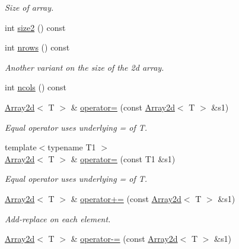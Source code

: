 \begin{DoxyCompactItemize}
\begin{DoxyCompactList}\small\item\em Size of array. \end{DoxyCompactList}\item 
int \mbox{\hyperlink{classXMLArray_1_1Array2d_a76f5ee9f75435c61089021f8cfbb6bf8}{size2}} () const
\item 
int \mbox{\hyperlink{classXMLArray_1_1Array2d_a05ca0ef1e6fdbafb2c7cc575f9c3081c}{nrows}} () const
\begin{DoxyCompactList}\small\item\em Another variant on the size of the 2d array. \end{DoxyCompactList}\item 
int \mbox{\hyperlink{classXMLArray_1_1Array2d_a9eecadb91fe97638a8d7adce77b0a562}{ncols}} () const
\item 
\mbox{\hyperlink{classXMLArray_1_1Array2d}{Array2d}}$<$ T $>$ \& \mbox{\hyperlink{classXMLArray_1_1Array2d_a9fafd7ae228834d56b08fb5b1485eba4}{operator=}} (const \mbox{\hyperlink{classXMLArray_1_1Array2d}{Array2d}}$<$ T $>$ \&s1)
\begin{DoxyCompactList}\small\item\em Equal operator uses underlying = of T. \end{DoxyCompactList}\item 
{\footnotesize template$<$typename T1 $>$ }\\\mbox{\hyperlink{classXMLArray_1_1Array2d}{Array2d}}$<$ T $>$ \& \mbox{\hyperlink{classXMLArray_1_1Array2d_a2ac560b13ec78975a0cab0b2dcbfe72f}{operator=}} (const T1 \&s1)
\begin{DoxyCompactList}\small\item\em Equal operator uses underlying = of T. \end{DoxyCompactList}\item 
\mbox{\hyperlink{classXMLArray_1_1Array2d}{Array2d}}$<$ T $>$ \& \mbox{\hyperlink{classXMLArray_1_1Array2d_a1e4469713c271b4d9c02ac881cdf00dd}{operator+=}} (const \mbox{\hyperlink{classXMLArray_1_1Array2d}{Array2d}}$<$ T $>$ \&s1)
\begin{DoxyCompactList}\small\item\em Add-\/replace on each element. \end{DoxyCompactList}\item 
\mbox{\hyperlink{classXMLArray_1_1Array2d}{Array2d}}$<$ T $>$ \& \mbox{\hyperlink{classXMLArray_1_1Array2d_aaeb259530dba3f189e129c935391d92a}{operator-\/=}} (const \mbox{\hyperlink{classXMLArray_1_1Array2d}{Array2d}}$<$ T $>$ \&s1)

\end{DoxyCompactItemize}
